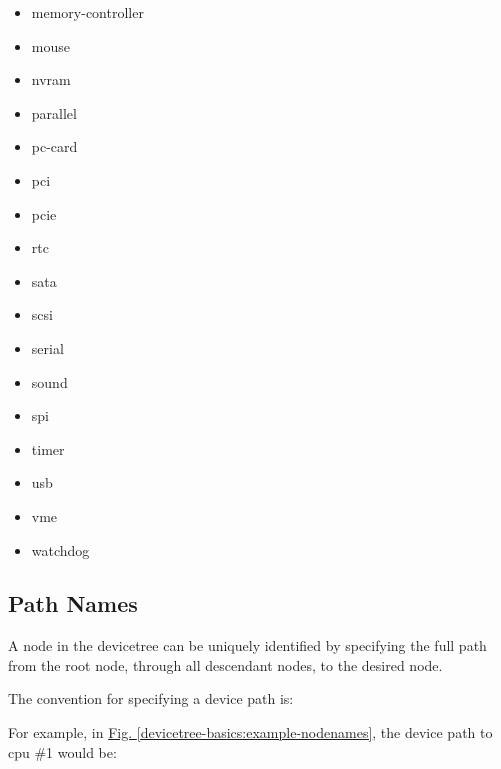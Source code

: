 \documentclass[a4paper,10pt,oneside]{sphinxmanual}
\begin{document}
\begin{itemize}
\item {} 
memory-controller

\item {} 
mouse

\item {} 
nvram

\item {} 
parallel

\item {} 
pc-card

\item {} 
pci

\item {} 
pcie

\item {} 
rtc

\item {} 
sata

\item {} 
scsi

\item {} 
serial

\item {} 
sound

\item {} 
spi

\item {} 
timer

\item {} 
usb

\item {} 
vme

\item {} 
watchdog

\end{itemize}


\subsection{Path Names}
\label{devicetree-basics:path-names}
A node in the devicetree can be uniquely identified by specifying the
full path from the root node, through all descendant nodes, to the
desired node.

The convention for specifying a device path is:
\begin{quote}

\end{quote}

For example, in \hyperref[devicetree-basics:example-nodenames]{Fig. \ref{devicetree-basics:example-nodenames}}, the device path to cpu \#1 would be:
\begin{quote}

\end{quote}
\end{document}
